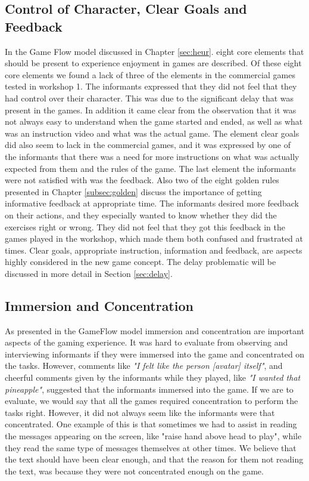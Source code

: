 \subsection{Control of Character, Clear Goals and Feedback}
In the Game Flow model \cite{sweetser} discussed in Chapter \ref{sec:heur}. eight core elements that should be present to experience enjoyment in games are described. Of these eight core elements we found a lack of three of the elements in the commercial games tested in workshop 1. The informants expressed that they did not feel that they had control over their character. This was due to the significant delay that was present in the games. In addition it came clear from the observation that it was not always easy to understand when the game started and ended, as well as what was an instruction video and what was the actual game. The element clear goals did also seem to lack in the commercial games, and it was expressed by one of the informants that there was a need for more instructions on what was actually expected from them and the rules of the game. The last element the informants were not satisfied with was the feedback. Also two of the eight golden \cite{mmi} rules presented in Chapter \ref{subsec:golden} discuss the importance of getting informative feedback at appropriate time. The informants desired more feedback on their actions, and they especially wanted to know whether they did the exercises right or wrong. They did not feel that they got this feedback in the games played in the workshop, which made them both confused and frustrated at times. Clear goals, appropriate instruction, information and feedback, are aspects highly considered in the new game concept. The delay problematic will be discussed in more detail in Section \ref{sec:delay}.
 
\subsection{Immersion and Concentration}
As presented in the GameFlow model \cite{sweetser} immersion and concentration are important aspects of the gaming experience. It was hard to evaluate from observing and interviewing informants if they were immersed into the game and concentrated on the tasks. However, comments like \emph{"I felt like the person [avatar] itself"}, and cheerful comments given by the informants while they played, like \emph{"I wanted that pineapple"}, suggested that the informants immersed into the game. If we are to evaluate, we would say that all the games required concentration to perform the tasks right. However, it did not always seem like the informants were that concentrated. One example of this is that sometimes we had to assist in reading the messages appearing on the screen, like "raise hand above head to play", while they read the same type of messages themselves at other times. We believe that the text should have been clear enough, and that the reason for them not reading the text, was because they were not concentrated enough on the game. 

